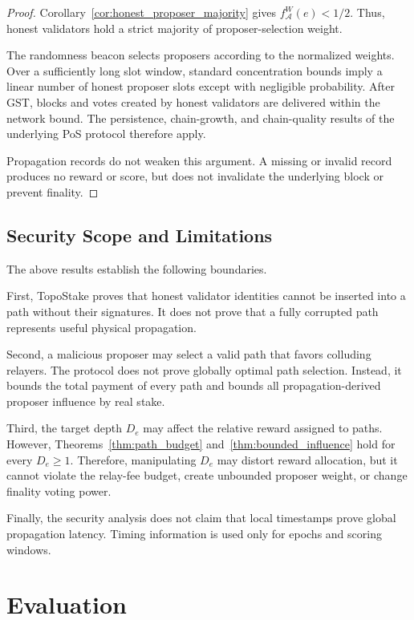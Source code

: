 \documentclass[lettersize,journal]{IEEEtran}
\begin{document}
\begin{proof}
Corollary~\ref{cor:honest_proposer_majority} gives
$f_{\mathcal{A}}^{W}(e)<1/2$.
Thus, honest validators hold a strict majority of proposer-selection weight.

The randomness beacon selects proposers according to the normalized weights.
Over a sufficiently long slot window, standard concentration bounds imply a linear number of honest proposer slots except with negligible probability.
After GST, blocks and votes created by honest validators are delivered within the network bound.
The persistence, chain-growth, and chain-quality results of the underlying PoS protocol therefore apply.

Propagation records do not weaken this argument.
A missing or invalid record produces no reward or score, but does not invalidate the underlying block or prevent finality.
\end{proof}


\subsection{Security Scope and Limitations}

The above results establish the following boundaries.

First, TopoStake proves that honest validator identities cannot be inserted into a path without their signatures.
It does not prove that a fully corrupted path represents useful physical propagation.

Second, a malicious proposer may select a valid path that favors colluding relayers.
The protocol does not prove globally optimal path selection.
Instead, it bounds the total payment of every path and bounds all propagation-derived proposer influence by real stake.

Third, the target depth $D_e$ may affect the relative reward assigned to paths.
However, Theorems~\ref{thm:path_budget} and~\ref{thm:bounded_influence} hold for every $D_e\geq1$.
Therefore, manipulating $D_e$ may distort reward allocation, but it cannot violate the relay-fee budget, create unbounded proposer weight, or change finality voting power.

Finally, the security analysis does not claim that local timestamps prove global propagation latency.
Timing information is used only for epochs and scoring windows.


\section{Evaluation}
\label{sec:evaluation}
\end{document}
